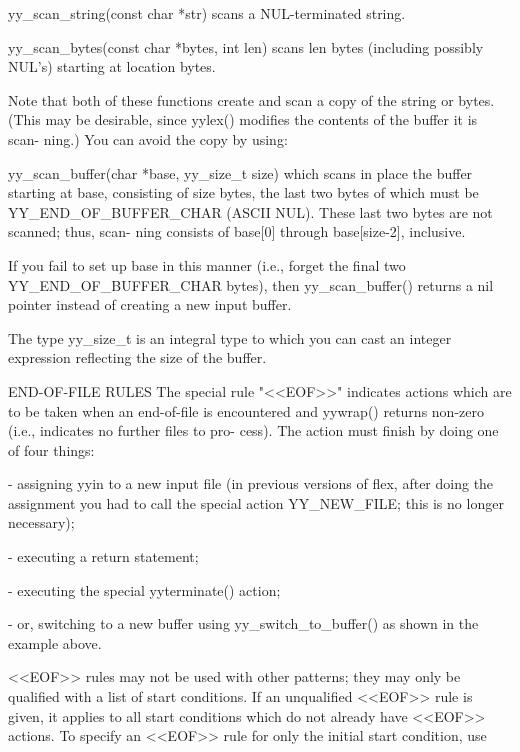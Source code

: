 \documentclass[12pt,spanish,twocolumn,lettersize]{article}
\begin{document}
{       yy_scan_string(const char *str)
	      scans a NUL-terminated string.

       yy_scan_bytes(const char *bytes, int len)
	      scans len bytes (including possibly NUL's) starting
	      at location bytes.

       Note  that  both of these functions create and scan a copy
       of the string or bytes.	(This  may  be	desirable,  since
       yylex()	modifies  the  contents of the buffer it is scan-
       ning.)  You can avoid the copy by using:

       yy_scan_buffer(char *base, yy_size_t size)
	      which scans in place the buffer starting	at  base,
	      consisting  of  size  bytes,  the last two bytes of
	      which must be  YY_END_OF_BUFFER_CHAR  (ASCII  NUL).
	      These  last  two bytes are not scanned; thus, scan-
	      ning  consists  of  base[0]  through  base[size-2],
	      inclusive.

	      If  you  fail  to set up base in this manner (i.e.,
	      forget the final two YY_END_OF_BUFFER_CHAR  bytes),
	      then yy_scan_buffer() returns a nil pointer instead
	      of creating a new input buffer.

	      The type yy_size_t is an integral type to which you
	      can  cast an integer expression reflecting the size
	      of the buffer.

END-OF-FILE RULES
       The special rule "<<EOF>>" indicates actions which are  to
       be  taken  when an end-of-file is encountered and yywrap()
       returns non-zero (i.e., indicates no further files to pro-
       cess).	The  action  must  finish  by  doing  one of four
       things:

       -      assigning yyin to a new  input  file  (in	 previous
	      versions	of  flex,  after doing the assignment you
	      had to call the special action YY_NEW_FILE; this is
	      no longer necessary);

       -      executing a return statement;

       -      executing the special yyterminate() action;

       -      or,    switching	  to	a    new   buffer   using
	      yy_switch_to_buffer()  as	 shown	in  the	  example
	      above.

       <<EOF>>	rules  may  not be used with other patterns; they
       may only be qualified with a list of start conditions.  If
       an  unqualified	<<EOF>>	 rule is given, it applies to all
       start  conditions  which	 do  not  already  have	  <<EOF>>
       actions.	  To specify an <<EOF>> rule for only the initial
       start condition, use

}
\end{document}
